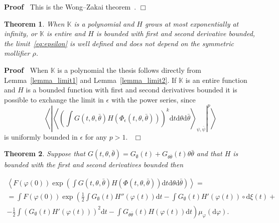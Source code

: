 \documentclass[a4paper,10pt]{article}
\newcommand{\mathd}{\mathrm{d}}
\newenvironment{proof}{\noindent\textbf{Proof\ }}{\hspace*{\fill}$\Box$\medskip}
\newtheorem{theorem}{Theorem}
\begin{document}
\begin{proof}
  This is the Wong--Zakai
  theorem~{\cite{wong_convergence_1965,wong_relation_1965,stroock_support_1972}}.
\end{proof}

\begin{theorem}
  \label{theorem_limit1}When $\mathbb{K}$ is a polynomial and $H$ grows at
  most exponentially at infinity, or $\mathbb{K}$ is entire and $H$ is bounded
  with first and second derivative bounded, the limit~{\eqref{eq:epsilon}} is
  well defined and does not depend on the symmetric mollifier $\rho$.
\end{theorem}

\begin{proof}
  When $\mathbb{K}$ is a polynomial the thesis follows directly from
  Lemma~\ref{lemma_limit1} and Lemma~\ref{lemma_limit2}. If $\mathbb{K}$ is an
  entire function and $H$ is a bounded function with first and second
  derivatives bounded it is possible to exchange the limit in $\epsilon$ with
  the power series, since $$\left\langle \left| \left\langle \left( \int G (t,
  \theta, \bar{\theta}) H (\Phi_{\epsilon} (t, \theta, \bar{\theta}))
  \right)^k \mathd t \mathd \theta \mathd \bar{\theta} \right\rangle_{\psi,
  \bar{\psi}} \right|^p \right\rangle$$ is uniformly bounded in $\epsilon$ for
  any $p > 1$. \ 
\end{proof}

\begin{theorem}
  \label{theorem_limit2}Suppose that $G (t, \theta, \bar{\theta}) =
  G_{\emptyset} (t) + G_{\theta \bar{\theta}} (t) \theta \bar{\theta}$ and
  that $H$ is bounded with the first and second derivatives bounded then
  
  \begin{multline}
    \left\langle F (\varphi (0)) \exp \left( \int G (t, \theta, \bar{\theta})
    H (\Phi (t, \theta, \bar{\theta})) \mathd t \mathd \theta \mathd
    \bar{\theta} \right) \right\rangle =\\
    = \int F (\varphi (0)) \exp \left( \frac{1}{2} \int G_{\emptyset} (t) H''
    (\varphi (t)) \mathd t - \int G_{\emptyset} (t) H' (\varphi (t)) \circ
    \mathd \xi (t) + \right.\\
    \left. - \frac{1}{2} \int (G_{\emptyset} (t) H' (\varphi (t)))^2 \mathd t
    - \int G_{\theta \bar{\theta}} (t) H (\varphi (t)) \mathd t \right)
    \mu_{\varphi} (\mathd \varphi) .
  \end{multline}
\end{theorem}
\end{document}
